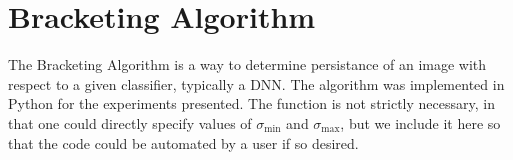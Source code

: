 







\section{Bracketing Algorithm}\label{sec:bracketing}
The Bracketing Algorithm is a way to determine persistance of an image with respect to a given classifier, typically a DNN. The algorithm was implemented in Python for the experiments presented. The  function is not strictly necessary, in that one could directly specify values of $\sigma_{\min}$ and $\sigma_{\max}$, but we include it here so that the code could be automated by a user if so desired.  



